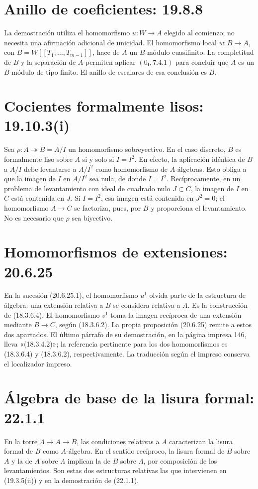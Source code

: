 \documentclass[11pt,a4paper]{article}
\begin{document}
\section*{Anillo de coeficientes: 19.8.8}
La demostración utiliza el homomorfismo $u:W\to A$ elegido al comienzo;
no necesita una afirmación adicional de unicidad.
El homomorfismo local $w:B\to A$, con
$B=W[[T_1,\ldots,T_{m-1}]]$, hace de $A$ un $B$-módulo cuasifinito.
La completitud de $B$ y la separación de $A$ permiten aplicar
$(0_{\mathrm I},7.4.1)$ para concluir que $A$ es un $B$-módulo de tipo
finito. El anillo de escalares de esa conclusión es $B$.

\section*{Cocientes formalmente lisos: 19.10.3(i)}
Sea $\rho:A\twoheadrightarrow B=A/I$ un homomorfismo sobreyectivo.
En el caso discreto, $B$ es formalmente liso sobre $A$ si y solo si $I=I^2$.
En efecto, la aplicación idéntica de $B$ a $A/I$ debe levantarse a
$A/I^2$ como homomorfismo de $A$-álgebras. Esto obliga a que la imagen de
$I$ en $A/I^2$ sea nula, de donde $I=I^2$.
Recíprocamente, en un problema de levantamiento con ideal de cuadrado nulo
$J\subset C$, la imagen de $I$ en $C$ está contenida en $J$.
Si $I=I^2$, esa imagen está contenida en $J^2=0$; el homomorfismo
$A\to C$ se factoriza, pues, por $B$ y proporciona el levantamiento.
No es necesario que $\rho$ sea biyectivo.

\section*{Homomorfismos de extensiones: 20.6.25}
En la sucesión (20.6.25.1), el homomorfismo $u^1$ olvida parte de la
estructura de álgebra: una extensión relativa a $B$ se considera relativa
a $A$. Es la construcción de (18.3.6.4). El homomorfismo $v^1$ toma la
imagen recíproca de una extensión mediante $B\to C$, según (18.3.6.2).
La propia proposición (20.6.25) remite a estos dos apartados.
El último párrafo de su demostración, en la página impresa 146, lleva
«(18.3.4.2)»; la referencia pertinente para los dos homomorfismos es
(18.3.6.4) y (18.3.6.2), respectivamente. La traducción según el impreso
conserva el localizador impreso.

\section*{Álgebra de base de la lisura formal: 22.1.1}
En la torre $\Lambda\to A\to B$, las condiciones relativas a $A$
caracterizan la lisura formal de $B$ como $A$-álgebra.
En el sentido recíproco, la lisura formal de $B$ sobre $A$ y la de $A$
sobre $\Lambda$ implican la de $B$ sobre $\Lambda$, por composición
de los levantamientos. Son estas dos estructuras relativas las que
intervienen en (19.3.5(ii)) y en la demostración de (22.1.1).
\end{document}

